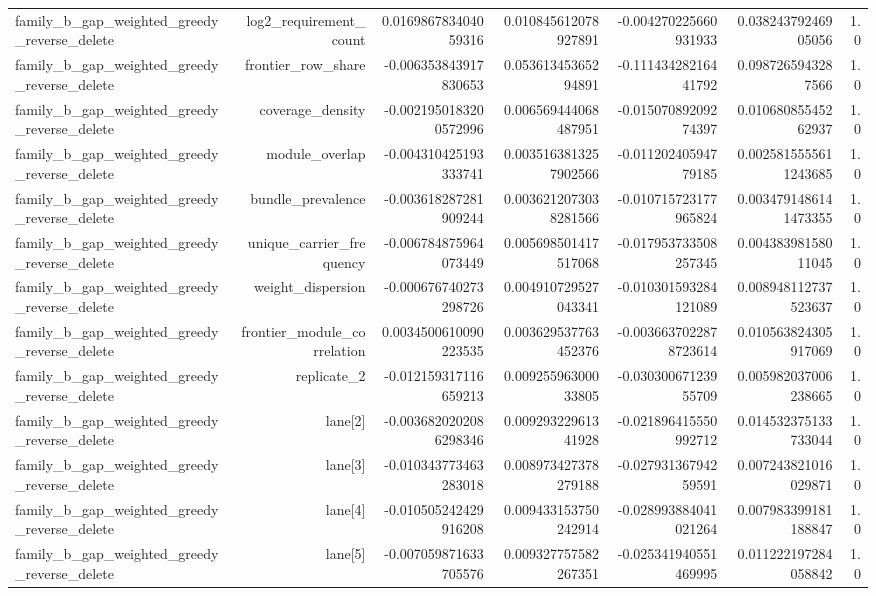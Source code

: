 {\begin{longtable}{lrrrrrr}
family\_b\_gap\_weighted\_greedy\_reverse\_delete & log2\_requirement\_count & 0.016986783404059316 & 0.010845612078927891 & -0.004270225660931933 & 0.03824379246905056 & 1.0 \\
family\_b\_gap\_weighted\_greedy\_reverse\_delete & frontier\_row\_share & -0.006353843917830653 & 0.05361345365294891 & -0.11143428216441792 & 0.0987265943287566 & 1.0 \\
family\_b\_gap\_weighted\_greedy\_reverse\_delete & coverage\_density & -0.0021950183200572996 & 0.006569444068487951 & -0.01507089209274397 & 0.01068085545262937 & 1.0 \\
family\_b\_gap\_weighted\_greedy\_reverse\_delete & module\_overlap & -0.004310425193333741 & 0.0035163813257902566 & -0.01120240594779185 & 0.0025815555611243685 & 1.0 \\
family\_b\_gap\_weighted\_greedy\_reverse\_delete & bundle\_prevalence & -0.003618287281909244 & 0.0036212073038281566 & -0.010715723177965824 & 0.0034791486141473355 & 1.0 \\
family\_b\_gap\_weighted\_greedy\_reverse\_delete & unique\_carrier\_frequency & -0.006784875964073449 & 0.005698501417517068 & -0.017953733508257345 & 0.00438398158011045 & 1.0 \\
family\_b\_gap\_weighted\_greedy\_reverse\_delete & weight\_dispersion & -0.000676740273298726 & 0.004910729527043341 & -0.010301593284121089 & 0.008948112737523637 & 1.0 \\
family\_b\_gap\_weighted\_greedy\_reverse\_delete & frontier\_module\_correlation & 0.0034500610090223535 & 0.003629537763452376 & -0.0036637022878723614 & 0.010563824305917069 & 1.0 \\
family\_b\_gap\_weighted\_greedy\_reverse\_delete & replicate\_2 & -0.012159317116659213 & 0.00925596300033805 & -0.03030067123955709 & 0.005982037006238665 & 1.0 \\
family\_b\_gap\_weighted\_greedy\_reverse\_delete & lane[2] & -0.0036820202086298346 & 0.00929322961341928 & -0.021896415550992712 & 0.014532375133733044 & 1.0 \\
family\_b\_gap\_weighted\_greedy\_reverse\_delete & lane[3] & -0.010343773463283018 & 0.008973427378279188 & -0.02793136794259591 & 0.007243821016029871 & 1.0 \\
family\_b\_gap\_weighted\_greedy\_reverse\_delete & lane[4] & -0.010505242429916208 & 0.009433153750242914 & -0.028993884041021264 & 0.007983399181188847 & 1.0 \\
family\_b\_gap\_weighted\_greedy\_reverse\_delete & lane[5] & -0.007059871633705576 & 0.009327757582267351 & -0.025341940551469995 & 0.011222197284058842 & 1.0 \\

\end{longtable}}
